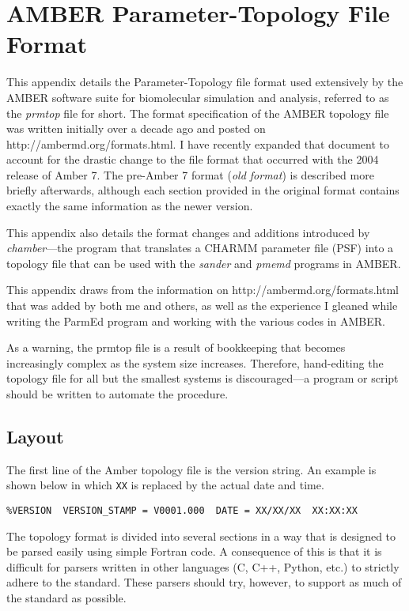 \chapter{AMBER Parameter-Topology File Format}%
\label{appendixB}

This appendix details the Parameter-Topology file format used extensively by the
AMBER software suite for biomolecular simulation and analysis, referred to as
the \emph{prmtop} file for short. The format specification of the AMBER topology
file was written initially over a decade ago and posted on
http://ambermd.org/formats.html. I have recently expanded that document to
account for the drastic change to the file format that occurred with the 2004
release of Amber 7. The pre-Amber 7 format (\emph{old format}) is described more
briefly afterwards, although each section provided in the original format
contains exactly the same information as the newer version.

This appendix also details the format changes and additions introduced by
\emph{chamber}---the program that translates a CHARMM parameter file (PSF) into
a topology file that can be used with the \emph{sander} and \emph{pmemd}
programs in AMBER.

This appendix draws from the information on http://ambermd.org/formats.html that
was added by both me and others, as well as the experience I gleaned while
writing the ParmEd program and working with the various codes in AMBER.

As a warning, the prmtop file is a result of bookkeeping that becomes
increasingly complex as the system size increases. Therefore, hand-editing the
topology file for all but the smallest systems is discouraged---a program or
script should be written to automate the procedure.

\section{Layout}

The first line of the Amber topology file is the version string. An example is
shown below in which {\tt XX} is replaced by the actual date and time.
\begin{verbatim}
%VERSION  VERSION_STAMP = V0001.000  DATE = XX/XX/XX  XX:XX:XX
\end{verbatim}

The topology format is divided into several sections in a way that is designed
to be parsed easily using simple Fortran code. A consequence of this is that it
is difficult for parsers written in other languages (\eg C, C++, Python, etc.)
to strictly adhere to the standard. These parsers should try, however, to
support as much of the standard as possible.

